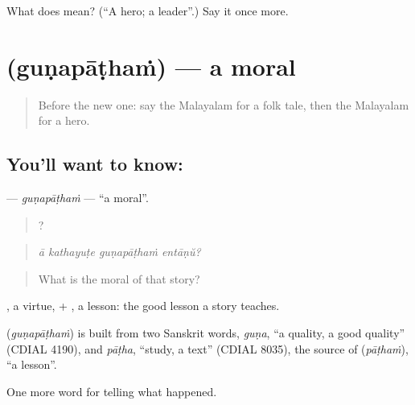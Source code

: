 \begin{tcolorbox}[breakable,colback=teal!4,colframe=teal!35!black,title={Before you move on}]
What does  mean? (\textquotedblleft{}A hero; a leader\textquotedblright{}.) Say it once more.
\end{tcolorbox}
\section[\texorpdfstring{\ml{ഗുണപാഠം} (guṇapāṭhaṁ)}{ഗുണപാഠം (guṇapāṭhaṁ)}]{ (guṇapāṭhaṁ) — a moral}

\label{lesson:ML-C402-gunapatham}



\begin{quote}
Before the new one: say the Malayalam for a folk tale, then the Malayalam for a hero.
\end{quote}

\subsection*{You'll want to know: }
\textbf{} — \emph{guṇapāṭhaṁ} — \textquotedblleft{}a moral\textquotedblright{}.

\begin{quote}
   ?
\end{quote}

\begin{quote}
\emph{ā kathayuṭe guṇapāṭhaṁ entāṇŭ?}
\end{quote}

\begin{quote}
What is the moral of that story?
\end{quote}

, a virtue, + , a lesson: the good lesson a story teaches.

\begin{cousinweb}
\textbf{} (\emph{guṇapāṭhaṁ}) is built from two Sanskrit words, \emph{guṇa}, \textquotedblleft{}a quality, a good quality\textquotedblright{} (CDIAL 4190), and \emph{pāṭha}, \textquotedblleft{}study, a text\textquotedblright{} (CDIAL 8035), the source of  (\emph{pāṭhaṁ}), \textquotedblleft{}a lesson\textquotedblright{}.
\end{cousinweb}

\begin{grammarlens}[title={What you've built}]
One more word for telling what happened.
\end{grammarlens}

